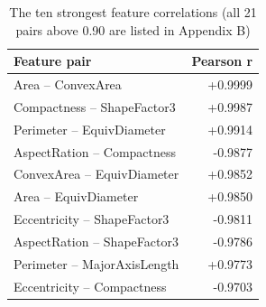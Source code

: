 \begin{table}[htbp]
\centering
\small
\caption{The ten strongest feature correlations (all 21 pairs above 0.90 are listed in Appendix B)}
\label{tab:corr_pairs}
\begin{tabular}{lr}
\toprule
Feature pair & Pearson r \\
\midrule
Area -- ConvexArea & +0.9999 \\
Compactness -- ShapeFactor3 & +0.9987 \\
Perimeter -- EquivDiameter & +0.9914 \\
AspectRation -- Compactness & -0.9877 \\
ConvexArea -- EquivDiameter & +0.9852 \\
Area -- EquivDiameter & +0.9850 \\
Eccentricity -- ShapeFactor3 & -0.9811 \\
AspectRation -- ShapeFactor3 & -0.9786 \\
Perimeter -- MajorAxisLength & +0.9773 \\
Eccentricity -- Compactness & -0.9703 \\
\bottomrule
\end{tabular}
\end{table}
